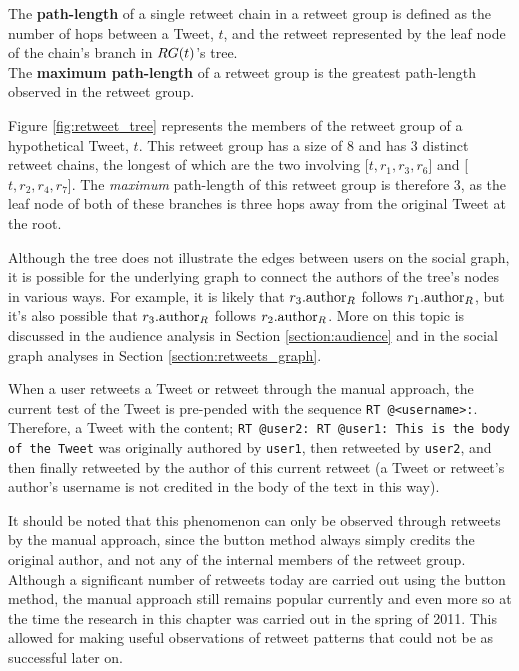 \begin{mydefinition}
\label{definition:path_length}
The \textbf{path-length} of a single retweet chain in a retweet group is defined as the number of hops between a Tweet, $t$, and the retweet represented by the leaf node of the chain's branch in $RG(t)$'s tree.\\
The \textbf{maximum path-length} of a retweet group is the greatest path-length observed in the retweet group.
\end{mydefinition}

Figure \ref{fig:retweet_tree} represents the members of the retweet group of a hypothetical Tweet, $t$. This retweet group has a size of 8 and has 3 distinct retweet chains, the longest of which are the two involving [$t, r_1, r_3, r_6$] and [$t, r_2, r_4, r_7$]. The \textit{maximum} path-length of this retweet group is therefore 3, as the leaf node of both of these branches is three hops away from the original Tweet at the root.

Although the tree does not illustrate the edges between users on the social graph, it is possible for the underlying graph to connect the authors of the tree's nodes in various ways. For example, it is likely that $r_3.\textrm{author}_R$ follows $r_1.\textrm{author}_R$, but it's also possible that $r_3.\textrm{author}_R$ follows $r_2.\textrm{author}_R$. More on this topic is discussed in the audience analysis in Section \ref{section:audience} and in the social graph analyses in Section  \ref{section:retweets_graph}.

When a user retweets a Tweet or retweet through the manual approach, the current test of the Tweet is pre-pended with the sequence \texttt{RT @<username>:}. Therefore, a Tweet with the content;\newline
\texttt{RT @user2: RT @user1: This is the body of the Tweet}\newline
was originally authored by \texttt{user1}, then retweeted by \texttt{user2}, and then finally retweeted by the author of this current retweet (a Tweet or retweet's author's username is not credited in the body of the text in this way).

It should be noted that this phenomenon can only be observed through retweets by the manual approach, since the button method always simply credits the original author, and not any of the internal members of the retweet group. Although a significant number of retweets today are carried out using the button method, the manual approach still remains popular currently and even more so at the time the research in this chapter was carried out in the spring of 2011. This allowed for making useful observations of retweet patterns that could not be as successful later on.


